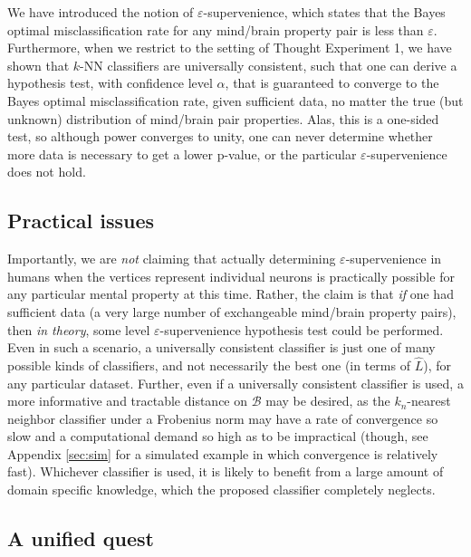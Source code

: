 \documentclass{article}
\newcommand{\mB}{\mathcal{B}}
\newcommand{\eps}{\varepsilon}
\providecommand{\mh}[1]{\widehat{#1}}
\begin{document}
We have introduced the notion of $\eps$-supervenience, which states that the Bayes optimal misclassification rate for any mind/brain property pair is less than $\eps$.  Furthermore, when we restrict to the setting of Thought Experiment 1, we have shown that $k$-NN classifiers are universally consistent, such that one can derive a hypothesis test, with confidence level $\alpha$, that is guaranteed to converge to the Bayes optimal misclassification rate, given sufficient data, no matter the true (but unknown) distribution of mind/brain pair properties.  Alas, this is a one-sided test, so although power converges to unity, one can never determine whether more data is necessary to get a lower p-value, or the particular $\eps$-supervenience does not hold.  

\subsection{Practical issues} %
\label{par:practical_issues}

Importantly, we are \emph{not} claiming that actually determining $\eps$-supervenience in humans when the vertices represent individual neurons is practically possible for any particular mental property at this time.  Rather, the claim is that \emph{if} one had sufficient data (a very large number of exchangeable mind/brain property pairs), then \emph{in theory}, some level $\eps$-supervenience hypothesis test could be performed.  Even in such a scenario, a universally consistent classifier is just one of many possible kinds of classifiers, and not necessarily the best one (in terms of $\mh{L}$), for any particular dataset.  Further, even if a universally consistent classifier is used, a more informative and tractable distance on $\mB$ may be desired, as the $k_n$-nearest neighbor classifier under a Frobenius norm may have a rate of convergence so slow and a computational demand so high as to be impractical (though, see Appendix \ref{sec:sim} for a simulated example in which convergence is relatively fast).  Whichever classifier is used, it is likely to benefit from a large amount of domain specific knowledge, which the proposed classifier completely neglects. 




\subsection{A unified quest} %
\label{sub:practical_applications}
\end{document}
